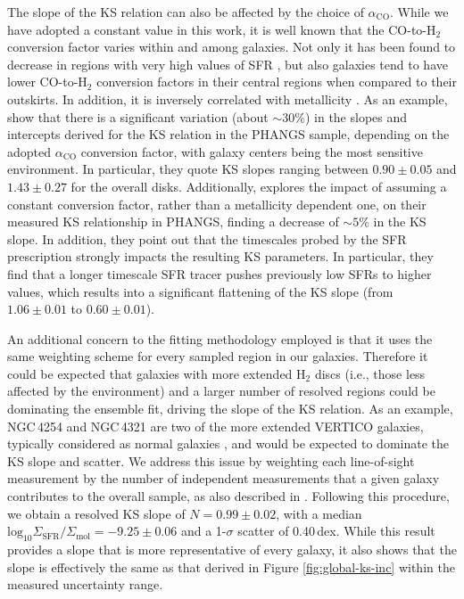 \documentclass[longauth]{aa}
\begin{document}
The slope of the KS relation can also be affected by the choice of $\alpha_\mathrm{CO}$. While we have adopted a constant value in this work, it is well known that the CO-to-H$_2$ conversion factor varies within and among galaxies. Not only it has been found to decrease in regions with very high values of SFR \citep{Downes1998,Bryant1999}, but also galaxies tend to have lower CO-to-H$_2$ conversion factors in their central regions \citep{Sandstrom2013} when compared to their outskirts. In addition, it is inversely correlated with metallicity \citep[e.g.,][]{Wilson1995,Genzel2012,Bolatto2013,Accurso2017,Sun2020}. As an example, \citet{Querejeta2021} show that there is a significant variation (about $\sim 30\%$) in the slopes and intercepts derived for the KS relation in the PHANGS sample, depending on the adopted $\alpha_\mathrm{CO}$ conversion factor, with galaxy centers being the most sensitive environment. In particular, they quote KS slopes ranging between $0.90\pm0.05$ and $1.43\pm0.27$ for the overall disks. Additionally, \citet{Pessa2021} explores the impact of assuming a constant conversion factor, rather than a metallicity dependent one, on their measured KS relationship in PHANGS, finding a decrease of $\sim 5\%$ in the KS slope. In addition, they point out that the timescales probed by the SFR prescription strongly impacts the resulting KS parameters. In particular, they find that a longer timescale SFR tracer pushes previously low SFRs to higher values, which results into a significant flattening of the KS slope (from $1.06\pm0.01$ to $0.60\pm0.01$).

An additional concern to the fitting methodology employed is that it uses the same weighting scheme for every sampled region in our galaxies. Therefore it could be expected that galaxies with more extended H$_2$ discs (i.e., those less affected by the environment) and a larger number of resolved regions could be dominating the ensemble fit, driving the slope of the KS relation. As an example, NGC\,4254 and NGC\,4321 are two of the more extended VERTICO galaxies, typically considered as normal galaxies \citep[see e.g., ][]{Pessa2021}, and would be expected to dominate the KS slope and scatter. We address this issue by weighting each line-of-sight measurement by the number of independent measurements that a given galaxy contributes to the overall sample, as also described in \citet{Zabel2020}. Following this procedure, we obtain a resolved KS slope of $N=0.99\pm0.02$, with a median $\mathrm{log}_{10} \Sigma_\mathrm{SFR}/\Sigma_\mathrm{mol}=-9.25\pm0.06$ and a 1-$\sigma$ scatter of 0.40\,dex. While this result provides a slope that is more representative of every galaxy, it also shows that the slope is effectively the same as that derived in Figure \ref{fig:global-ks-inc} within the measured uncertainty range.
\end{document}
